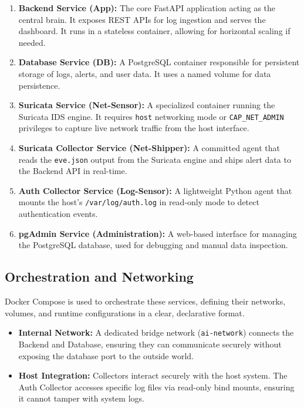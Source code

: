 \documentclass[12pt,a4paper]{report} %
\begin{document}
\begin{enumerate}
    \item \textbf{Backend Service (App):} The core FastAPI application acting as the central brain. It exposes REST APIs for log ingestion and serves the dashboard. It runs in a stateless container, allowing for horizontal scaling if needed.
    \item \textbf{Database Service (DB):} A PostgreSQL container responsible for persistent storage of logs, alerts, and user data. It uses a named volume for data persistence.
    \item \textbf{Suricata Service (Net-Sensor):} A specialized container running the Suricata IDS engine. It requires \texttt{host} networking mode or \texttt{CAP\_NET\_ADMIN} privileges to capture live network traffic from the host interface.
    \item \textbf{Suricata Collector Service (Net-Shipper):} A committed agent that reads the \texttt{eve.json} output from the Suricata engine and ships alert data to the Backend API in real-time.
    \item \textbf{Auth Collector Service (Log-Sensor):} A lightweight Python agent that mounts the host's \texttt{/var/log/auth.log} in read-only mode to detect authentication events.
    \item \textbf{pgAdmin Service (Administration):} A web-based interface for managing the PostgreSQL database, used for debugging and manual data inspection.
\end{enumerate}

\subsection{Orchestration and Networking}
Docker Compose is used to orchestrate these services, defining their networks, volumes, and runtime configurations in a clear, declarative format.

\begin{itemize}
    \item \textbf{Internal Network:} A dedicated bridge network (\texttt{ai-network}) connects the Backend and Database, ensuring they can communicate securely without exposing the database port to the outside world.
    \item \textbf{Host Integration:} Collectors interact securely with the host system. The Auth Collector accesses specific log files via read-only bind mounts, ensuring it cannot tamper with system logs.
\end{itemize}
\end{document}
